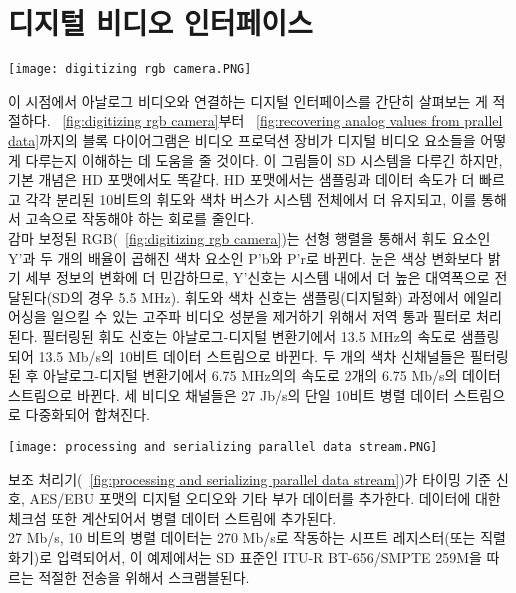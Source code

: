 \chapter{디지털 비디오 인터페이스}
\begin{figure*}
    \centering
    \texttt{[image: digitizing rgb camera.PNG]}
    \caption{RGB 카메라 신호의 디지털화}\label{fig:digitizing rgb camera}
\end{figure*}
이 시점에서 아날로그 비디오와 연결하는 디지털 인터페이스를 간단히 살펴보는 게 적절하다.
\figurename~\ref{fig:digitizing rgb camera}부터 \figurename~\ref{fig:recovering analog values from prallel data}까지의 블록 다이어그램은 비디오 프로덕션 장비가 디지털 비디오 요소들을 어떻게 다루는지 이해하는 데 도움을 줄 것이다.
이 그림들이 SD 시스템을 다루긴 하지만, 기본 개념은 HD 포맷에서도 똑같다. HD 포맷에서는 샘플링과 데이터 속도가 더 빠르고 각각 분리된 10비트의 휘도와 색차 버스가 시스템 전체에서 더 유지되고, 이를 통해서 고속으로 작동해야 하는 회로를 줄인다.
\\
감마 보정된 RGB(\figurename~\ref{fig:digitizing rgb camera})는 선형 행렬을 통해서 휘도 요소인 Y'과 두 개의 배율이 곱해진 색차 요소인 P'b와 P'r로 바뀐다.
눈은 색상 변화보다 밝기 세부 정보의 변화에 더 민감하므로, Y'신호는 시스템 내에서 더 높은 대역폭으로 전달된다(SD의 경우 5.5 MHz).
휘도와 색차 신호는 샘플링(디지털화) 과정에서 에일리어싱을 일으킬 수 있는 고주파 비디오 성분을 제거하기 위해서 저역 통과 필터로 처리된다.
필터링된 휘도 신호는 아날로그-디지털 변환기에서 13.5 MHz의 속도로 샘플링되어 13.5 Mb/s의 10비트 데이터 스트림으로 바뀐다.
두 개의 색차 신채널들은 필터링된 후 아날로그-디지털 변환기에서 6.75 MHz의의 속도로 2개의 6.75 Mb/s의 데이터 스트림으로 바뀐다.
세 비디오 채널들은 27 Jb/s의 단일 10비트 병렬 데이터 스트림으로 다중화되어 합쳐진다.
\\
\begin{figure*}
    \centering
    \texttt{[image: processing and serializing parallel data stream.PNG]}
    \caption{병렬 데이터 스트림의 처리와 직렬화}\label{fig:processing and serializing parallel data stream}
\end{figure*}
보조 처리기(\figurename~\ref{fig:processing and serializing parallel data stream})가 타이밍 기준 신호, AES/EBU 포맷의 디지털 오디오와 기타 부가 데이터를 추가한다. 데이터에 대한 체크섬 또한 계산되어서 병렬 데이터 스트림에 추가된다.
\\
27 Mb/s, 10 비트의 병렬 데이터는 270 Mb/s로 작동하는 시프트 레지스터(또는 직렬화기)로 입력되어서, 이 예제에서는 SD 표준인 ITU-R BT-656/SMPTE 259M을 따르는 적절한 전송을 위해서 스크램블된다.
